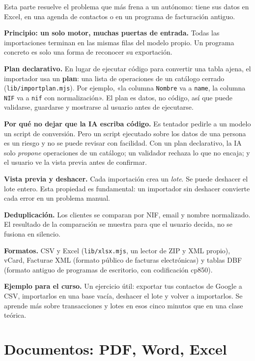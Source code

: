 Esta parte resuelve el problema que más frena a un autónomo: tiene sus datos en Excel, en una agenda de contactos o en un programa de facturación antiguo.

\textbf{Principio: un solo motor, muchas puertas de entrada.} Todas las importaciones terminan en las mismas filas del modelo propio. Un programa concreto es solo una forma de reconocer su exportación.

\textbf{Plan declarativo.} En lugar de ejecutar código para convertir una tabla ajena, el importador usa un \textbf{plan}: una lista de operaciones de un catálogo cerrado (\texttt{lib/importplan.mjs}). Por ejemplo, «la columna \texttt{Nombre} va a \texttt{name}, la columna \texttt{NIF} va a \texttt{nif} con normalización». El plan es datos, no código, así que puede validarse, guardarse y mostrarse al usuario antes de ejecutarse.

\textbf{Por qué no dejar que la IA escriba código.} Es tentador pedirle a un modelo un script de conversión. Pero un script ejecutado sobre los datos de una persona es un riesgo y no se puede revisar con facilidad. Con un plan declarativo, la IA solo \emph{propone} operaciones de un catálogo; un validador rechaza lo que no encaja; y el usuario ve la vista previa antes de confirmar.

\textbf{Vista previa y deshacer.} Cada importación crea un \emph{lote}. Se puede deshacer el lote entero. Esta propiedad es fundamental: un importador sin deshacer convierte cada error en un problema manual.

\textbf{Deduplicación.} Los clientes se comparan por NIF, email y nombre normalizado. El resultado de la comparación se muestra para que el usuario decida, no se fusiona en silencio.

\textbf{Formatos.} CSV y Excel (\texttt{lib/xlsx.mjs}, un lector de ZIP y XML propio), vCard, Facturae XML (formato público de facturas electrónicas) y tablas DBF (formato antiguo de programas de escritorio, con codificación cp850).

\textbf{Ejemplo para el curso.} Un ejercicio útil: exportar tus contactos de Google a CSV, importarlos en una base vacía, deshacer el lote y volver a importarlos. Se aprende más sobre transacciones y lotes en esos cinco minutos que en una clase teórica.

\chapter{Documentos: PDF, Word, Excel}\label{documentos-pdf-word-excel}

